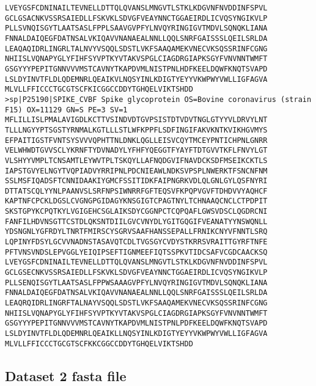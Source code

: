 \begin{lstlisting}
LVEYGSFCDNINAILTEVNELLDTTQLQVANSLMNGVTLSTKLKDGVNFNVDDINFSPVL
GCLGSACNKVSSRSAIEDLLFSKVKLSDVGFVEAYNNCTGGAEIRDLICVQSYNGIKVLP
PLLSVNQISGYTLAATSASLFPPLSAAVGVPFYLNVQYRINGIGVTMDVLSQNQKLIANA
FNNALDAIQEGFDATNSALVKIQAVVNANAEALNNLLQQLSNRFGAISSSLQEILSRLDA
LEAQAQIDRLINGRLTALNVYVSQQLSDSTLVKFSAAQAMEKVNECVKSQSSRINFCGNG
NHIISLVQNAPYGLYFIHFSYVPTKYVTAKVSPGLCIAGDRGIAPKSGYFVNVNNTWMFT
GSGYYYPEPITGNNVVVMSTCAVNYTKAPDVMLNISTPNLHDFKEELDQWFKNQTSVAPD
LSLDYINVTFLDLQDEMNRLQEAIKVLNQSYINLKDIGTYEYYVKWPWYVWLLIGFAGVA
MLVLLFFICCCTGCGTSCFKICGGCCDDYTGHQELVIKTSHDD
>sp|P25190|SPIKE_CVBF Spike glycoprotein OS=Bovine coronavirus (strain F15) OX=11129 GN=S PE=3 SV=1
MFLILLISLPMALAVIGDLKCTTVSINDVDTGVPSISTDTVDVTNGLGTYYVLDRVYLNT
TLLLNGYYPTSGSTYRNMALKGTLLLSTLWFKPPFLSDFINGIFAKVKNTKVIKHGVMYS
EFPAITIGSTFVNTSYSVVVQPHTTNLDNKLQGLLEISVCQYTMCEYPNTICHPNLGNRR
VELWHWDTGVVSCLYKRNFTYDVNADYLYFHFYQEGGTFYAYFTDTGVVTKFLFNVYLGT
VLSHYYVMPLTCNSAMTLEYWVTPLTSKQYLLAFNQDGVIFNAVDCKSDFMSEIKCKTLS
IAPSTGVYELNGYTVQPIADVYRRIPNLPDCNIEAWLNDKSVPSPLNWERKTFSNCNFNM
SSLMSFIQADSFTCNNIDAAKIYGMCFSSITIDKFAIPNGRKVDLQLGNLGYLQSFNYRI
DTTATSCQLYYNLPAANVSLSRFNPSIWNRRFGFTEQSVFKPQPVGVFTDHDVVYAQHCF
KAPTNFCPCKLDGSLCVGNGPGIDAGYKNSGIGTCPAGTNYLTCHNAAQCNCLCTPDPIT
SKSTGPYKCPQTKYLVGIGEHCSGLAIKSDYCGGNPCTCQPQAFLGWSVDSCLQGDRCNI
FANFILHDVNSGTTCSTDLQKSNTDIILGVCVNYDLYGITGQGIFVEANATYYNSWQNLL
YDSNGNLYGFRDYLTNRTFMIRSCYSGRVSAAFHANSSEPALLFRNIKCNYVFNNTLSRQ
LQPINYFDSYLGCVVNADNSTASAVQTCDLTVGSGYCVDYSTKRRSVRAITTGYRFTNFE
PFTVNSVNDSLEPVGGLYEIQIPSEFTIGNMEEFIQTSSPKVTIDCSAFVCGDCAACKSQ
LVEYGSFCDNINAILTEVNELLDTTQLQVANSLMNGVTLSTKLKDGVNFNVDDINFSPVL
GCLGSECNKVSSRSAIEDLLFSKVKLSDVGFVEAYNNCTGGAEIRDLICVQSYNGIKVLP
PLLSENQISGYTLAATSASLFPPWSAAAGVPFYLNVQYRINGIGVTMDVLSQNQKLIANA
FNNALDAIQEGFDATNSALVKIQAVVNANAEALNNLLQQLSNRFGAISSSLQEILSRLDA
LEAQRQIDRLINGRFTALNAYVSQQLSDSTLVKFSAAQAMEKVNECVKSQSSRINFCGNG
NHIISLVQNAPYGLYFIHFSYVPTKYVTAKVSPGLCIAGDRGIAPKSGYFVNVNNTWMFT
GSGYYYPEPITGNNVVVMSTCAVNYTKAPDVMLNISTPNLPDFKEELDQWFKNQTSVAPD
LSLDYINVTFLDLQDEMNRLQEAIKLLNQSYINLKDIGTYEYYVKWPWYVWLLIGFAGVA
MLVLLFFICCCTGCGTSCFKKCGGCCDDYTGHQELVIKTSHDD
\end{lstlisting}

\subsection{Dataset 2 fasta file}

